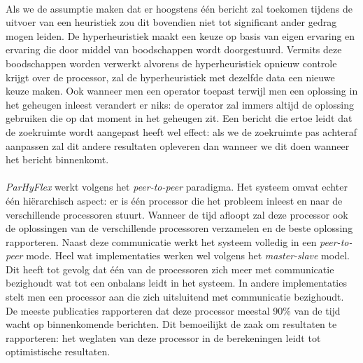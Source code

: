 \paragraph{}%
Als we de assumptie maken dat er hoogstens \'e\'en bericht zal toekomen tijdens de uitvoer van een heuristiek zou dit bovendien niet tot significant ander gedrag mogen leiden. De hyperheuristiek maakt een keuze op basis van eigen ervaring en ervaring die door middel van boodschappen wordt doorgestuurd. Vermits deze boodschappen worden verwerkt alvorens de hyperheuristiek opnieuw controle krijgt over de processor, zal de hyperheuristiek met dezelfde data een nieuwe keuze maken. Ook wanneer men een operator toepast terwijl men een oplossing in het geheugen inleest verandert er niks: de operator zal immers altijd de oplossing gebruiken die op dat moment in het geheugen zit. Een bericht die ertoe leidt dat de zoekruimte wordt aangepast heeft wel effect: als we de zoekruimte pas achteraf aanpassen zal dit andere resultaten opleveren dan wanneer we dit doen wanneer het bericht binnenkomt.

\paragraph{}
\emph{ParHyFlex} werkt volgens het \emph{peer-to-peer} paradigma. Het systeem omvat echter \'e\'en hi\"erarchisch aspect: er is \'e\'en processor die het probleem inleest en naar de verschillende processoren stuurt. Wanneer de tijd afloopt zal deze processor ook de oplossingen van de verschillende processoren verzamelen en de beste oplossing rapporteren. Naast deze communicatie werkt het systeem volledig in een \emph{peer-to-peer} mode. Heel wat implementaties werken wel volgens het \emph{master-slave} model\cite{conf/gecco/LeonMS08,conf/pdp/SeguraSL12}. Dit heeft tot gevolg dat \'e\'en van de processoren zich meer met communicatie bezighoudt wat tot een onbalans leidt in het systeem. In andere implementaties\cite{Rattadilok04adistributed} stelt men een processor aan die zich uitsluitend met communicatie bezighoudt. De meeste publicaties rapporteren dat deze processor meestal 90\% van de tijd wacht op binnenkomende berichten. Dit bemoeilijkt de zaak om resultaten te rapporteren: het weglaten van deze processor in de berekeningen leidt tot optimistische resultaten.